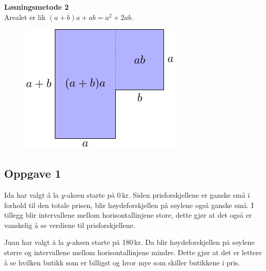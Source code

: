 \textbf{Løsningsmetode 2}\\
Arealet er lik $ (a+b)a + ab = a^2+2ab$.
\begin{figure}
	\includegraphics[]{opg7d1_b}
\end{figure}

\newpage
\subsection*{Oppgave 1}
Ida har valgt å la $ y$-aksen starte på 0\,kr. Siden prisforskjellene er ganske små i forhold til den totale prisen, blir høydeforskjellen på søylene også ganske små. I tillegg blir intervallene mellom horisontallinjene store, dette gjør at det også er vanskelig å se verdiene til prisforskjellene.\vsk

Juan har valgt å la $ y $-aksen starte på 180\,kr. Da blir høydeforskjellen på søylene større og intervallene mellom horisontallinjene mindre. Dette gjør at det er lettere å se hvilken butikk som er billigst og hvor mye som skiller butikkene i pris.
